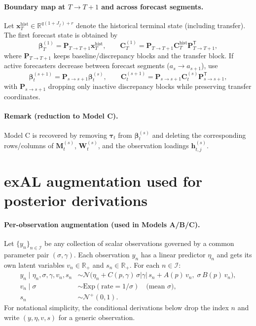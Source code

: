 \documentclass[11pt]{article}
\newcommand{\R}{\mathbb{R}}
\newcommand{\1}{\mathbb{I}}
\newcommand{\N}{\mathcal{N}}
\newcommand{\Exp}{\mathrm{Exp}}
\newcommand{\T}{\mathsf{T}}
\begin{document}
\paragraph{Boundary map at $T\to T+1$ and across forecast segments.}
Let $\bm x_T^{\mathrm{hist}}\in\R^{q(1+J_f)+r}$ denote the historical terminal state
(including transfer). The first forecast state is obtained by
\[
\bm\beta_{T}^{(1)}=\bm P_{T\to T+1}\bm x_T^{\mathrm{hist}},
\qquad
\bm C_{T}^{(1)}=\bm P_{T\to T+1}\bm C_T^{\mathrm{hist}}\bm P_{T\to T+1}^\T,
\]
where $\bm P_{T\to T+1}$ keeps baseline/discrepancy blocks and the transfer block.
If active forecasters decrease between forecast segments ($a_s\to a_{s+1}$), use
\[
\bm\beta_t^{(s+1)}=\bm P_{s\to s+1}\bm\beta_t^{(s)},
\qquad
\bm C_t^{(s+1)}=\bm P_{s\to s+1}\bm C_t^{(s)}\bm P_{s\to s+1}^\T,
\]
with $\bm P_{s\to s+1}$ dropping only inactive discrepancy blocks while preserving transfer coordinates.

\paragraph{Remark (reduction to Model C).}
Model C is recovered by removing $\bm\tau_t$ from $\bm\beta_t^{(s)}$
and deleting the corresponding rows/columns of $\bm M_t^{(s)}$, $\bm W_t^{(s)}$,
and the observation loadings $\bm h_{t,j}^{(s)}$.

\section{exAL augmentation used for posterior derivations}

\paragraph{Per-observation augmentation (used in Models A/B/C).}
Let $\{y_n\}_{n\in\mathcal{I}}$ be any collection of scalar observations governed by a common parameter pair $(\sigma,\gamma)$.
Each observation $y_n$ has a linear predictor $\eta_n$ and gets its own latent variables
$v_n\in\R_+$ and $s_n\in\R_+$.
For each $n\in\mathcal{I}$:
\begin{align}
y_n \mid \eta_n,\sigma,\gamma,v_n,s_n
&\sim \N\!\Big(\eta_n + C(p,\gamma)\,\sigma|\gamma|\,s_n + A(p)\,v_n,\;\sigma\,B(p)\,v_n\Big), \label{eq:aug_y}\\
v_n\mid\sigma &\sim \Exp(\text{rate}=1/\sigma)\quad\text{(mean $\sigma$)},\label{eq:aug_v}\\
s_n &\sim \N^+(0,1). \label{eq:aug_s}
\end{align}
For notational simplicity, the conditional derivations below drop the index $n$ and write $(y,\eta,v,s)$ for a generic observation.
\end{document}
